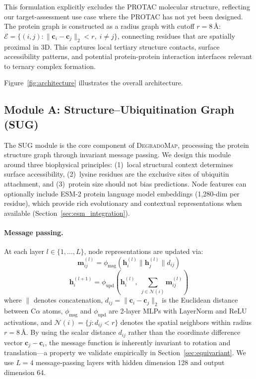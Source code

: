 \documentclass[sigconf]{acmart}
\newcommand{\ours}{\textsc{DegradoMap}}
\begin{document}
This formulation explicitly excludes the PROTAC molecular structure, reflecting our target-assessment use case where the PROTAC has not yet been designed.
The protein graph is constructed as a radius graph with cutoff $r = 8$\,\AA{}: $\mathcal{E} = \{(i,j) : \|\mathbf{c}_i - \mathbf{c}_j\|_2 < r,\; i \neq j\}$, connecting residues that are spatially proximal in 3D.
This captures local tertiary structure contacts, surface accessibility patterns, and potential protein-protein interaction interfaces relevant to ternary complex formation.

Figure~\ref{fig:architecture} illustrates the overall architecture.

\subsection{Module A: Structure--Ubiquitination Graph (SUG)}
\label{sec:sug}

The SUG module is the core component of \ours{}, processing the protein structure graph through invariant message passing.
We design this module around three biophysical principles: (1)~local structural context determines surface accessibility, (2)~lysine residues are the exclusive sites of ubiquitin attachment, and (3)~protein size should not bias predictions.
Node features can optionally include ESM-2 protein language model embeddings (1,280-dim per residue), which provide rich evolutionary and contextual representations when available (Section~\ref{sec:esm_integration}).

\paragraph{Message passing.}
At each layer $l \in \{1, \ldots, L\}$, node representations are updated via:
\begin{equation}
    \mathbf{m}_{ij}^{(l)} = \phi_{\text{msg}}\!\left(\mathbf{h}_i^{(l)} \| \mathbf{h}_j^{(l)} \| d_{ij}\right)
    \label{eq:message}
\end{equation}
\begin{equation}
    \mathbf{h}_i^{(l+1)} = \phi_{\text{upd}}\!\left(\mathbf{h}_i^{(l)},\; \sum_{j \in \mathcal{N}(i)} \mathbf{m}_{ij}^{(l)}\right)
    \label{eq:update}
\end{equation}
where $\|$ denotes concatenation, $d_{ij} = \|\mathbf{c}_i - \mathbf{c}_j\|_2$ is the Euclidean distance between C$\alpha$ atoms, $\phi_{\text{msg}}$ and $\phi_{\text{upd}}$ are 2-layer MLPs with LayerNorm and ReLU activations, and $\mathcal{N}(i) = \{j : d_{ij} < r\}$ denotes the spatial neighbors within radius $r = 8$\,\AA{}.
By using the scalar distance $d_{ij}$ rather than the coordinate difference vector $\mathbf{c}_j - \mathbf{c}_i$, the message function is inherently invariant to rotation and translation---a property we validate empirically in Section~\ref{sec:equivariant}.
We use $L = 4$ message-passing layers with hidden dimension 128 and output dimension 64.
\end{document}
